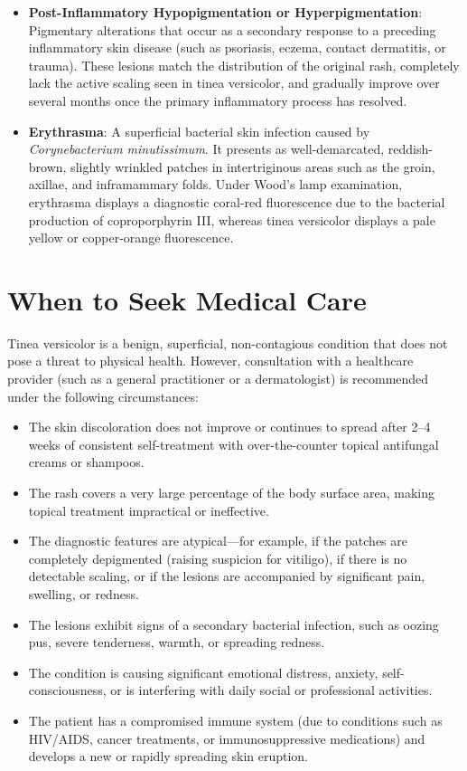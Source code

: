 \begin{itemize}
    \item \textbf{Post-Inflammatory Hypopigmentation or Hyperpigmentation}: Pigmentary alterations that occur as a secondary response to a preceding inflammatory skin disease (such as psoriasis, eczema, contact dermatitis, or trauma). These lesions match the distribution of the original rash, completely lack the active scaling seen in tinea versicolor, and gradually improve over several months once the primary inflammatory process has resolved.
    \item \textbf{Erythrasma}: A superficial bacterial skin infection caused by \textit{Corynebacterium minutissimum}. It presents as well-demarcated, reddish-brown, slightly wrinkled patches in intertriginous areas such as the groin, axillae, and inframammary folds. Under Wood's lamp examination, erythrasma displays a diagnostic coral-red fluorescence due to the bacterial production of coproporphyrin III, whereas tinea versicolor displays a pale yellow or copper-orange fluorescence.
\end{itemize}

\section*{When to Seek Medical Care}
Tinea versicolor is a benign, superficial, non-contagious condition that does not pose a threat to physical health. However, consultation with a healthcare provider (such as a general practitioner or a dermatologist) is recommended under the following circumstances:
\begin{itemize}
    \item The skin discoloration does not improve or continues to spread after 2--4 weeks of consistent self-treatment with over-the-counter topical antifungal creams or shampoos.
    \item The rash covers a very large percentage of the body surface area, making topical treatment impractical or ineffective.
    \item The diagnostic features are atypical---for example, if the patches are completely depigmented (raising suspicion for vitiligo), if there is no detectable scaling, or if the lesions are accompanied by significant pain, swelling, or redness.
    \item The lesions exhibit signs of a secondary bacterial infection, such as oozing pus, severe tenderness, warmth, or spreading redness.
    \item The condition is causing significant emotional distress, anxiety, self-consciousness, or is interfering with daily social or professional activities.
    \item The patient has a compromised immune system (due to conditions such as HIV/AIDS, cancer treatments, or immunosuppressive medications) and develops a new or rapidly spreading skin eruption.
\end{itemize}


